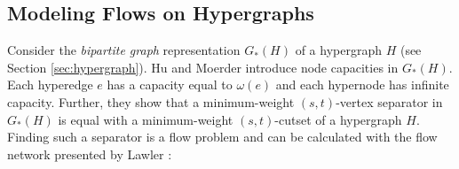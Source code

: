 
\subsection{Modeling Flows on Hypergraphs}
\label{sec:related_lawler}

Consider the \emph{bipartite graph} representation $G_*(H)$ of a hypergraph $H$ (see Section \ref{sec:hypergraph}).
Hu and Moerder \cite{HuMoerder85} introduce node capacities in $G_*(H)$. Each hyperedge
$e$ has a capacity equal to $\omega(e)$ and each hypernode has infinite capacity. 
Further, they show that a minimum-weight $(s,t)$-vertex separator in $G_*(H)$
is equal with a minimum-weight $(s,t)$-cutset of a hypergraph $H$. 
Finding such a separator is a flow problem and can be calculated with the flow network  
presented by Lawler \cite{lawler1973}:

